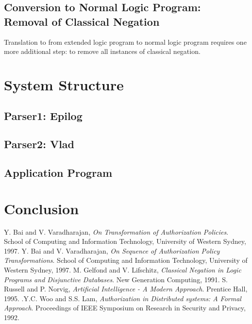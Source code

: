 \documentclass[a4paper]{article}
\begin{document}
    \subsection{Conversion to Normal Logic Program: Removal of Classical Negation}

      Translation to from extended logic program to normal logic program 
      requires one more additional step: to remove all instances of classical 
      negation. 

    \pagebreak

  \section{System Structure}

    \subsection{Parser1: Epilog}

    \subsection{Parser2: Vlad}

    \subsection{Application Program}

    \pagebreak

  \section{Conclusion}

    \pagebreak

  \begin{thebibliography}{}
    Y. Bai and V. Varadharajan, \emph{On Transformation of Authorization Policies}. School of Computing and Information Technology, University of Western Sydney, 1997.
    Y. Bai and V. Varadharajan, \emph{On Sequence of Authorization Policy Transformations}. School of Computing and Information Technology, University of Western Sydney, 1997.
    M. Gelfond and V. Lifschitz, \emph{Classical Negation in Logic Programs and Disjunctive Databases}. New Generation Computing, 1991.
    S. Russell and P. Norvig, \emph{Artificial Intelligence - A Modern Approach}. Prentice Hall, 1995.
    .Y.C. Woo and S.S. Lam, \emph{Authorization in Distributed systems: A Formal Approach}. Proceedings of IEEE Symposium on Research in Security and Privacy, 1992.
  \end{thebibliography}
\end{document}
